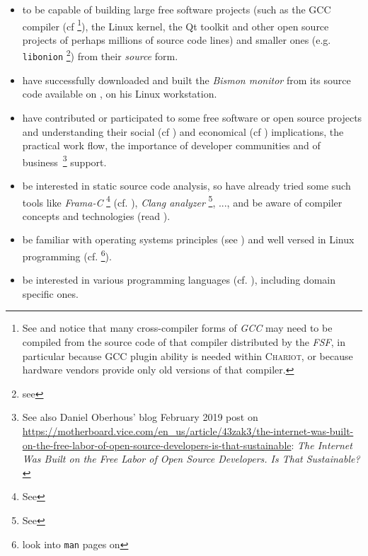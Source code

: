 \begin{itemize}
\item to be capable of building large free software projects (such as
  the GCC compiler (cf \cite{gcc-internals} \footnote{See
     and notice that many cross-compiler
    forms of \emph{GCC} may need to be compiled from the source code
    of that compiler distributed by the \emph{FSF}, in particular
    because GCC plugin ability is needed within \textsc{Chariot}, or
    because hardware vendors provide only old versions of that
    compiler.}), the Linux kernel, the Qt toolkit and other open
  source projects of perhaps millions of source code lines) and
  smaller ones (e.g. \texttt{libonion} \footnote{see
    }) from their \emph{source}
  form.

\item have successfully downloaded and built the \emph{Bismon monitor}
   from its source code available on
  , on his Linux
  workstation.
  
\item have contributed or participated to some free software or open
  source projects and understanding their social (cf
  \cite{Raymond:2001:CathBaz}) and economical (cf
  \cite{Weber:2004:SuccessOpenSource, Tirole:2016:EcoBienCommun,
    Nagle:2018:Contributing, DiCosmo:1998:Holdup,
    Lerner-Tirole:2000:economics-open-source}) implications, the
  practical work flow, the importance of developer communities and of
  business~\footnote{See also Daniel Oberhous' blog February 2019 post
    on
    \url{https://motherboard.vice.com/en_us/article/43zak3/the-internet-was-built-on-the-free-labor-of-open-source-developers-is-that-sustainable}:
    \emph{The Internet Was Built on the Free Labor of Open Source
      Developers. Is That Sustainable?}} support.
  
\item be interested in static source code analysis, so have already
  tried some such tools like \emph{Frama-C} \footnote{See
    } (cf. \cite{Cuoq:2012:Frama-C}),
  \emph{Clang analyzer} \footnote{See
    }, ..., and be aware of
   compiler concepts and technologies (read
  \cite{Aho:2006:DragonBook}).

\item be familiar with operating systems principles
  (see \cite{Tanenbaum:92:OS,ArpaciDusseau14-Book}) and well
  versed in Linux programming
  (cf. \cite{Mitchell:2001:ALP,Kerrisk:2010:LinuxProgramming} \footnote{look
    into \texttt{man} pages on
    }).

  \item be interested in various programming languages
    (cf. \cite{Abelson1996:SICP,Scott:2007:PLP,Queinnec:1996:LSP}),
    including domain specific ones.

\end{itemize}



